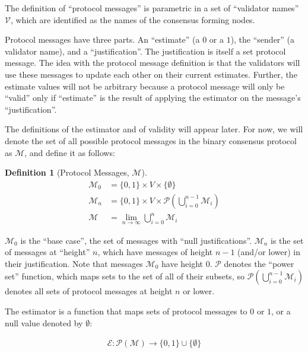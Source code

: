 \documentclass{article}
\theoremstyle{definition}
\newtheorem{defn}{Definition}[section]
\begin{document}
The definition of ``protocol messages'' is parametric in a set of ``validator names'' $\mathcal{V}$, which are identified as the names of the consensus forming nodes.

Protocol messages have three parts. An ``estimate'' (a $0$ or a $1$), the ``sender'' (a validator name), and a ``justification''. The justification is itself a set protocol message. The idea with the protocol message definition is that the validators will use these messages to update each other on their current estimates. Further, the estimate values will not be arbitrary because a protocol message will only be ``valid'' only if ``estimate'' is the result of applying the estimator on the message's ``justification''. 

The definitions of the estimator and of validity will appear later. For now, we will denote the set of all possible protocol messages in the binary consensus protocol as $\mathcal{M}$, and define it as follows:

\begin{defn}[Protocol Messages, $\mathcal{M}$]
\begin{equation*}
\begin{split}
    \mathcal{M}_0 &= \{0, 1\} \times V \times \{\emptyset\}\\
    \mathcal{M}_n &= \{0, 1\} \times V \times \mathcal{P}(\bigcup_{i=0}^{n-1} \mathcal{M}_i)\\
    \mathcal{M} &= \lim_{n \to \infty} \bigcup_{i=0}^{n} \mathcal{M}_i
\end{split}
\end{equation*}
\end{defn}

$\mathcal{M}_0$ is the ``base case'', the set of messages with ``null justifications''. $\mathcal{M}_n$ is the set of messages at ``height'' $n$, which have messages of height $n-1$ (and/or lower) in their justification. Note that messages $\mathcal{M}_0$ have height $0$. $\mathcal{P}$ denotes the ``power set'' function, which maps sets to the set of all of their subsets, so $\mathcal{P}(\bigcup_{i=0}^{n-1} \mathcal{M}_i)$ denotes all sets of protocol messages at height $n$ or lower.
  
The estimator is a function that maps sets of protocol messages to $0$ or $1$, or a null value denoted by $\emptyset$:
  
\begin{equation*}
\begin{split}
    \mathcal{E}:\mathcal{P}(\mathcal{M}) \to \{0, 1\} \cup \{\emptyset\}
\end{split}
\end{equation*}
\end{document}
